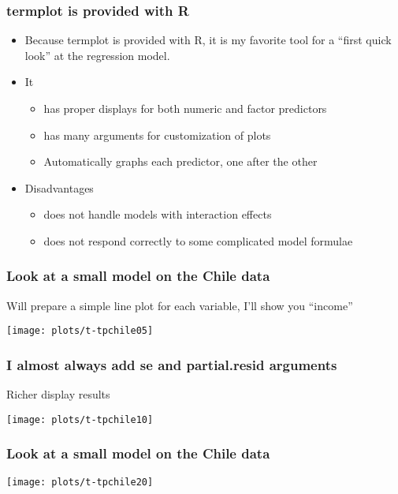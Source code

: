 \documentclass[10pt,english]{beamer}
\begin{document}
\begin{frame}
\frametitle{termplot is provided with R}
\begin{itemize}
\item Because termplot is provided with R, it is my favorite tool for a
``first quick look'' at the regression model.
\item It

\begin{itemize}
\item has proper displays for both numeric and factor predictors
\item has many arguments for customization of plots
\item Automatically graphs each predictor, one after the other
\end{itemize}
\item Disadvantages

\begin{itemize}
\item does not handle models with interaction effects
\item does not respond correctly to some complicated model formulae
\end{itemize}
\end{itemize}
\end{frame}

\begin{frame}[containsverbatim]
\frametitle{Look at a small model on the Chile data}



Will prepare a simple line plot for each variable, I'll show you ``income''


\texttt{[image: plots/t-tpchile05]}

\end{frame}

\begin{frame}[containsverbatim]
\frametitle{I almost always add se and partial.resid arguments}

Richer display results




\texttt{[image: plots/t-tpchile10]}

\end{frame}

\begin{frame}
\frametitle{Look at a small model on the Chile data}


\texttt{[image: plots/t-tpchile20]}

\end{frame}
\end{document}
